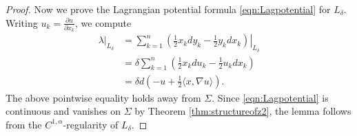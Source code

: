 \documentclass[11pt,a4paper]{article}
\numberwithin{equation}{section}%
\theoremstyle{definition}
\begin{document}
\begin{proof}
Now we prove the Lagrangian potential formula \eqref{eqn:Lagpotential} for $L_\delta$. Writing $u_k=\frac{\partial u}{\partial x_k}$, we compute
    \begin{equation*}
        \begin{aligned}
            \lambda|_{L_\delta}
            &=
            \sum_{k=1}^n
            \left.
            \left(
            \frac{1}{2}x_kdy_k-\frac{1}{2}y_kdx_k
            \right)
            \right|_{L_\delta} \\
            &=
            \delta\sum_{k=1}^n
            \left(
            \frac{1}{2}x_k du_k-\frac{1}{2}u_kdx_k
            \right)\\
            &=
            \delta d\left(-u+\frac{1}{2}\langle x,\nabla u\rangle\right).
        \end{aligned}
    \end{equation*}
    The above pointwise equality holds away from $\Sigma$. Since \eqref{eqn:Lagpotential} is continuous and vanishes on $\Sigma$ by Theorem \ref{thm:structureofz2}, the lemma follows from the $C^{1,\alpha}$-regularity of $L_\delta$. 
\end{proof}
\end{document}
